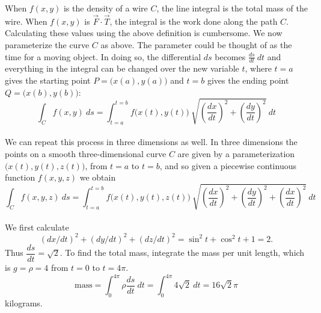 When $f(x,y)$ is the density of a wire $C$, the line integral is the total mass of the wire. When $f(x,y)$ is $\vec F \cdot \vec T$, the integral is the work done along the path $C$. Calculating these values using the above definition is cumbersome. We now parameterize the curve $C$ as above.  The parameter could be thought of as the time for a moving object.  In doing so, the differential $ds$ becomes $\frac{ds}{dt} \: dt$ and everything in the integral can be changed over the new variable $t$, where $t = a$ gives the starting point $P = \big(x(a),y(a)\big)$ and $t = b$ gives the ending point $Q = \big(x(b),y(b)\big)$:
$$\int_C f(x,y) \: ds = \int_{t=a}^{t=b} f\big(x(t),y(t)\big) \: \sqrt{\left(\dfrac{dx}{dt}\right)^2+\left(\dfrac{dy}{dt}\right)^2} \: dt$$\\

We can repeat this process in three dimensions as well. In three dimensions the points on a smooth three-dimensional curve $C$ are given by a parameterization $\big(x(t), y(t), z(t)\big)$, from $t = a$ to $t = b$, and so given a piecewise continuous function $f(x,y,z)$ we obtain
$$\int_C f(x,y,z) \: ds = \int_{t=a}^{t=b} f\big(x(t),y(t),z(t)\big) \: \sqrt{\left(\dfrac{dx}{dt}\right)^2+\left(\dfrac{dy}{dt}\right)^2 + \left(\dfrac{dx}{dt}\right)^2} \: dt$$\\


{We first calculate 
$$(dx/dt)^2 + (dy/dt)^2 + (dz/dt)^2 = \sin^2 t + \cos^2 t + 1 = 2.$$ Thus
$\dfrac{ds}{dt} = \sqrt{2}$. To find the total mass, integrate the mass per unit length, which is $g = \rho = 4$ from $t = 0$ to $t = 4\pi$.
$$\text{mass}=\int_0^{4\pi} \rho \dfrac{ds}{dt} \: dt = \int_0^{4\pi}4\sqrt{2}\: dt = 16\sqrt{2}\pi$$
kilograms.}\\

\\




